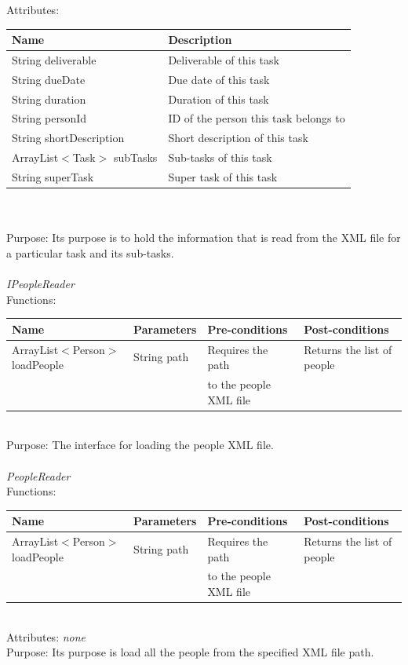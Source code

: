 Attributes:\\
\begin{tabular}{| l | l |}
\hline
 Name                                     	 	& Description\\
\hline
String deliverable			& Deliverable of this task\\
\hline
String dueDate			& Due date of this task\\
\hline
String duration		 		& Duration of this task\\
\hline
String personId			& ID of the person this task belongs to\\
\hline
String shortDescription		& Short description of this task\\
\hline
ArrayList$<$Task$>$ subTasks	& Sub-tasks of this task\\
\hline
String superTask			& Super task of this task\\
\hline
\end{tabular}\\
\\

Purpose: Its purpose is to hold the information that is read from the XML file for a particular task and its sub-tasks.
\\
\\

\emph{IPeopleReader}\\
Functions:\\
\begin{tabular}{| l | l | l | l |}
\hline
Name & Parameters & Pre-conditions & Post-conditions\\
\hline
		ArrayList$<$Person$>$loadPeople 	& String path       & Requires the path 	& Returns the list of people\\
                                                                                    &                          & to the people XML file	& 
\\
\hline
\end{tabular}
\\

Purpose: The interface for loading the people XML file.
\\
\\
\emph{PeopleReader}\\
Functions:\\
\begin{tabular}{| l | l | l | l |}
\hline
Name & Parameters & Pre-conditions & Post-conditions\\
\hline
		ArrayList$<$Person$>$loadPeople 	& String path       & Requires the path 	& Returns the list of people\\
                                                                                    &                          & to the people XML file	& 
\\
\hline
\end{tabular}
\\

Attributes: \emph{none}\\

Purpose: Its purpose is load all the people from the specified XML file path.
\\
\\